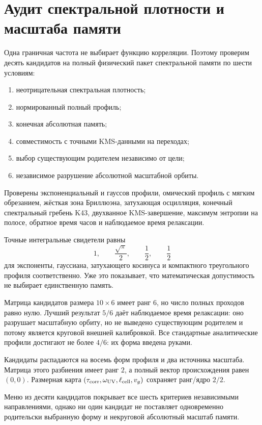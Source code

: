 \chapter{Аудит спектральной плотности и масштаба памяти}
\label{ch:v10-nonequilibrium-bath-spectral-memory-audit}

Одна граничная частота не выбирает функцию корреляции. Поэтому проверим
десять кандидатов на полный физический пакет спектральной памяти по шести
условиям:
\begin{enumerate}
\item неотрицательная спектральная плотность;
\item нормированный полный профиль;
\item конечная абсолютная память;
\item совместимость с точными KMS-данными на переходах;
\item выбор существующим родителем независимо от цели;
\item независимое разрушение абсолютной масштабной орбиты.
\end{enumerate}

Проверены экспоненциальный и гауссов профили, омический профиль с мягким
обрезанием, жёсткая зона Бриллюэна, затухающая осцилляция, конечный
спектральный гребень K43, двухванное KMS-завершение, максимум энтропии на
полосе, обратное время часов и наблюдаемое время релаксации.

Точные интегральные свидетели равны
\begin{equation}
 1,\qquad \frac{\sqrt\pi}{2},\qquad
 \frac12,\qquad \frac12
\end{equation}
для экспоненты, гауссиана, затухающего косинуса и компактного треугольного
профиля соответственно. Уже это показывает, что математическая
допустимость не выбирает единственную память.

Матрица кандидатов размера $10\times6$ имеет ранг $6$, но число полных
проходов равно нулю. Лучший результат $5/6$ даёт наблюдаемое время
релаксации: оно разрушает масштабную орбиту, но не выведено существующим
родителем и потому является круговой внешней калибровкой. Все стандартные
аналитические профили достигают не более $4/6$: их форма введена руками.

Кандидаты распадаются на восемь форм профиля и два источника масштаба.
Матрица этого разбиения имеет ранг $2$, а полный вектор происхождения равен
$(0,0)$. Размерная карта
$(\tau_{\rm corr},\omega_{\rm UV},\ell_{\rm cell},v_g)$ сохраняет
ранг/ядро $2/2$.

\begin{theorem}
Меню из десяти кандидатов покрывает все шесть критериев независимыми
направлениями, однако ни один кандидат не поставляет одновременно
родительски выбранную форму и некруговой абсолютный масштаб памяти.
\end{theorem}

